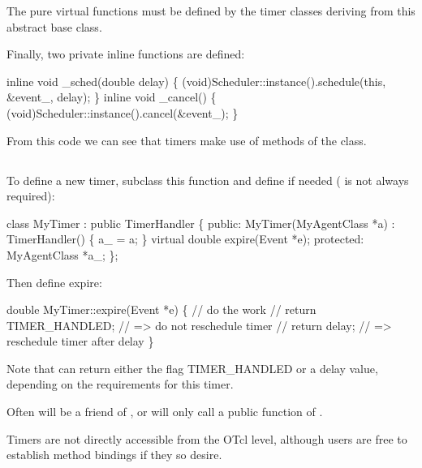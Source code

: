 The pure virtual functions must be defined by the timer classes deriving
from this abstract base class.

Finally, two private inline functions are defined:
\begin{program}
        inline void _sched(double delay) \{
            (void)Scheduler::instance().schedule(this, &event_, delay);
        \}
        inline void _cancel() \{
            (void)Scheduler::instance().cancel(&event_);
        \}
\end{program}

From this code we can see that timers make use of methods of the 
 class.

\subsection{}

To define a new timer, subclass this function and
define  if needed
( is not always required):
\begin{program}
        class MyTimer : public TimerHandler \{
        public:
          MyTimer(MyAgentClass *a) : TimerHandler() \{ a_ = a; \}
          virtual double expire(Event *e);
        protected:
          MyAgentClass *a_;
        \};
\end{program}
Then define expire:
\begin{program}
        double
        MyTimer::expire(Event *e)
        \{
          // {\cf do the work}
          // return TIMER_HANDLED;    // {\cf => do not reschedule timer}
          // return delay;            // {\cf => reschedule timer after delay}
        \}
\end{program}
Note that  can return either the flag TIMER\_HANDLED or a
delay value, depending on the requirements for this timer.

Often  will be a friend of , or 
 will only call a public function of .

Timers are not directly accessible from the OTcl level, although users are
free to establish method bindings if they so desire.

